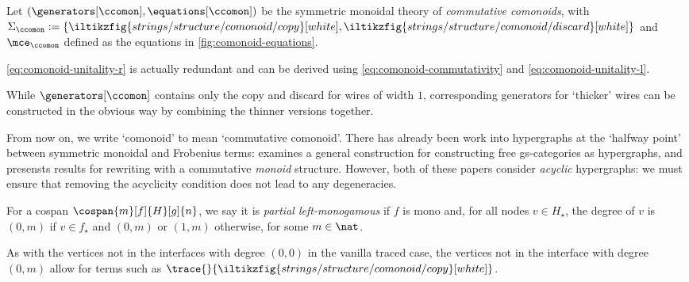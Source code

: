 \begin{definition}
    Let \((\generators[\ccomon], \equations[\ccomon])\) be the symmetric
    monoidal theory of \emph{commutative comonoids}, with \(\Sigma_\ccomon := \{
        \iltikzfig{strings/structure/comonoid/copy}[white],
        \iltikzfig{strings/structure/comonoid/discard}[white]
    \}\) and \(\mce_\ccomon\) defined as the equations in
    \cref{fig:comonoid-equations}.
\end{definition}

\begin{remark}
    \eqref{eq:comonoid-unitality-r} is actually redundant and can be derived
    using \eqref{eq:comonoid-commutativity} and \eqref{eq:comonoid-unitality-l}.
\end{remark}

\begin{remark}
    While \(\generators[\ccomon]\) contains only the copy and discard for
    wires of width \(1\), corresponding generators for `thicker' wires can be
    constructed in the obvious way by combining the thinner versions together.
\end{remark}

From now on, we write `comonoid' to mean `commutative comonoid'.
There has already been work into hypergraphs at the `halfway point' between
symmetric monoidal and Frobenius terms: \cite{fritz2022free} examines a general
construction for constructing free gs-categories as hypergraphs, and
\cite{milosavljevic2022string} presensts results for rewriting with a
commutative \emph{monoid} structure.
However, both of these papers consider \emph{acyclic} hypergraphs: we must
ensure that removing the acyclicity condition does not lead to any degeneracies.

\begin{definition}
    For a cospan \(\cospan{m}[f]{H}[g]{n}\), we say it is
    \emph{partial left-monogamous} if \(f\) is mono and, for all nodes
    \(v \in H_\star\), the degree of \(v\) is \((0,m)\) if \(v \in f_\star\) and
    \((0,m)\) or \((1,m)\) otherwise, for some \(m \in \nat\).
\end{definition}

\begin{remark}
    As with the vertices not in the interfaces with degree \((0, 0)\) in the
    vanilla traced case, the vertices not in the interface with degree
    \((0, m)\) allow for terms such as \(
        \trace{}{\iltikzfig{strings/structure/comonoid/copy}[white]}
    \).
\end{remark}

